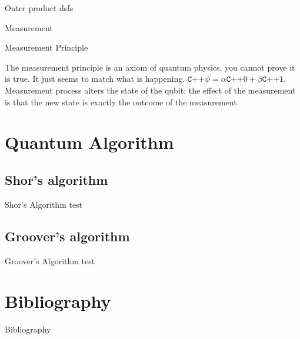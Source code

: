 \documentclass[svgnames,smaller,aspectratio=169]{beamer}
\newcommand*{\ket}{\texttt{C++}}
\begin{document}
\begin{frame}[fragile]{Outer product}
  dsfs
\end{frame}

\begin{frame}[fragile]{Measurement}
  \begin{block}{Measurement Principle}
    
  \end{block}
  The measurement principle is an axiom of quantum physics, you cannot prove it is true. It just seems to match what is
  happening.  $\ket{\psi}= \alpha\ket{0} + \beta\ket{1}$. Measurement process alters the state of the qubit: the effect
  of the measurement is that the new state is exactly the outcome of the measurement.
\end{frame}



\section{Quantum Algorithm}

\subsection{Shor's algorithm}

\begin{frame}[fragile]{Shor's Algorithm}
  test
\end{frame}


\subsection{Groover's algorithm}
\begin{frame}[fragile]{Groover's Algorithm}
test
\end{frame}

\section*{Bibliography}
\begin{frame}[allowframebreaks]{Bibliography}
\printbibliography
\end{frame}
\end{document}
